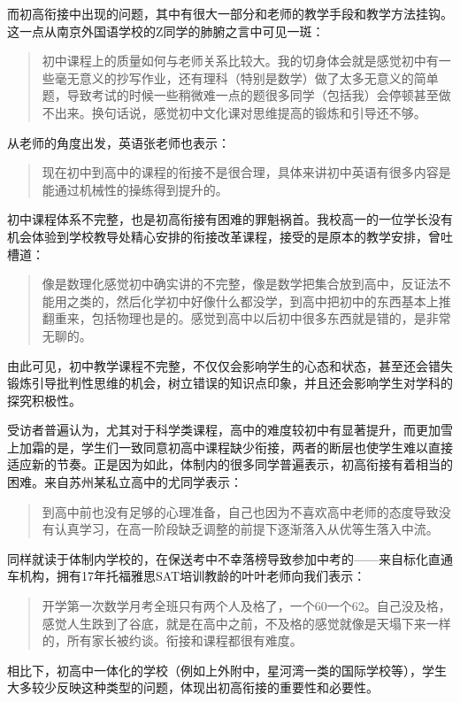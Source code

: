 \documentclass[12pt,UTF8]{ctexart}
\begin{document}
\par{
	而初高衔接中出现的问题，其中有很大一部分和老师的教学手段和教学方法挂钩。这一点从南京外国语学校的Z同学的肺腑之言中可见一斑：
	\begin{quote}
		\kaishu
		初中课程上的质量如何与老师关系比较大。我的切身体会就是感觉初中有一些毫无意义的抄写作业，还有理科（特别是数学）做了太多无意义的简单题，导致考试的时候一些稍微难一点的题很多同学（包括我）会停顿甚至做不出来。换句话说，感觉初中文化课对思维提高的锻炼和引导还不够。
	\end{quote}
	从老师的角度出发，英语张老师也表示：
	\begin{quote}
		\kaishu 现在初中到高中的课程的衔接不是很合理，具体来讲初中英语有很多内容是能通过机械性的操练得到提升的。
	\end{quote}
	初中课程体系不完整，也是初高衔接有困难的罪魁祸首。我校高一的一位学长没有机会体验到学校教导处精心安排的衔接改革课程，接受的是原本的教学安排，曾吐槽道：
	\begin{quote}
		\kaishu
		像是数理化感觉初中确实讲的不完整，像是数学把集合放到高中，反证法不能用之类的，然后化学初中好像什么都没学，到高中把初中的东西基本上推翻重来，包括物理也是的。感觉到高中以后初中很多东西就是错的，是非常无聊的。
	\end{quote}
	由此可见，初中教学课程不完整，不仅仅会影响学生的心态和状态，甚至还会错失锻炼引导批判性思维的机会，树立错误的知识点印象，并且还会影响学生对学科的探究积极性。
}
\par {
	
	受访者普遍认为，尤其对于科学类课程，高中的难度较初中有显著提升，而更加雪上加霜的是，学生们一致同意初高中课程缺少衔接，两者的断层也使学生难以直接适应新的节奏。正是因为如此，体制内的很多同学普遍表示，初高衔接有着相当的困难。来自苏州某私立高中的尤同学表示：\begin{quote}
		\kaishu 到高中前也没有足够的心理准备，自己也因为不喜欢高中老师的态度导致没有认真学习，在高一阶段缺乏调整的前提下逐渐落入从优等生落入中流。
	\end{quote}
	同样就读于体制内学校的，在保送考中不幸落榜导致参加中考的——来自标化直通车机构，拥有17年托福雅思SAT培训教龄的叶叶老师向我们表示：
	\begin{quote}
		\kaishu
		开学第一次数学月考全班只有两个人及格了，一个60一个62。自己没及格，感觉人生跌到了谷底，就是在高中之前，不及格的感觉就像是天塌下来一样的，所有家长被约谈。衔接和课程都很有难度。
	\end{quote}
	相比下，初高中一体化的学校（例如上外附中，星河湾一类的国际学校等），学生大多较少反映这种类型的问题，体现出初高衔接的重要性和必要性。
}
\end{document}
